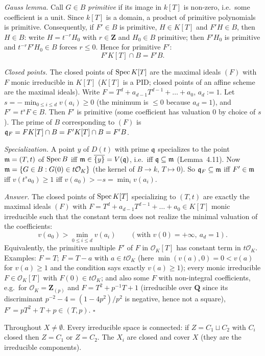 \documentclass[11pt]{article}
\begin{document}
\emph{Gauss lemma.} Call $G\in B$ \emph{primitive} if its image in $k[T]$ is non-zero, i.e.\ some coefficient is a unit. Since $k[T]$ is a domain, a product of primitive polynomials is primitive. Consequently, if $F'\in B$ is primitive, $H\in K[T]$ and $F'H\in B$, then $H\in B$: write $H=t^{-r}H_0$ with $r\in\mathbf Z$ and $H_0\in B$ primitive; then $F'H_0$ is primitive and $t^{-r}F'H_0\in B$ forces $r\le0$. Hence for primitive $F'$:
\[ F'K[T]\cap B=F'B. \]

\emph{Closed points.} The closed points of $\operatorname{Spec} K[T]$ are the maximal ideals $(F)$ with $F$ monic irreducible in $K[T]$ ($K[T]$ is a PID; closed points of an affine scheme are the maximal ideals). Write $F=T^d+a_{d-1}T^{d-1}+\dots+a_0$, $a_d:=1$. Let $s=-\min_{0\le i\le d}v(a_i)\ge0$ (the minimum is $\le0$ because $a_d=1$), and $F'=t^sF\in B$. Then $F'$ is primitive (some coefficient has valuation $0$ by choice of $s$). The prime of $B$ corresponding to $(F)$ is $\mathfrak q_F=FK[T]\cap B=F'K[T]\cap B=F'B$.

\emph{Specialization.} A point $y$ of $D(t)$ with prime $\mathfrak q$ specializes to the point $\mathfrak m=(T,t)$ of $\operatorname{Spec} B$ iff $\mathfrak m\in\overline{\{y\}}=V(\mathfrak q)$, i.e.\ iff $\mathfrak q\subseteq\mathfrak m$ (Lemma~4.11). Now $\mathfrak m=\{G\in B: G(0)\in t\mathcal O_K\}$ (the kernel of $B\to k$, $T\mapsto0$). So $\mathfrak q_F\subseteq\mathfrak m$ iff $F'\in\mathfrak m$ iff $v(t^sa_0)\ge1$ iff $v(a_0)>-s=\min_i v(a_i)$.

\emph{Answer.} The closed points of $\operatorname{Spec} K[T]$ specializing to $(T,t)$ are exactly the maximal ideals $(F)$ with $F=T^d+a_{d-1}T^{d-1}+\dots+a_0\in K[T]$ monic irreducible such that the constant term does not realize the minimal valuation of the coefficients:
\[ v(a_0)>\min_{0\le i\le d}v(a_i)\qquad(\text{with }v(0)=+\infty,\ a_d=1). \]
Equivalently, the primitive multiple $F'$ of $F$ in $\mathcal O_K[T]$ has constant term in $t\mathcal O_K$. Examples: $F=T$; $F=T-a$ with $a\in t\mathcal O_K$ (here $\min(v(a),0)=0<v(a)$ for $v(a)\ge1$ and the condition says exactly $v(a)\ge1$); every monic irreducible $F\in\mathcal O_K[T]$ with $F(0)\in t\mathcal O_K$; and also some $F$ with non-integral coefficients, e.g.\ for $\mathcal O_K=\mathbf Z_{(p)}$ and $F=T^2+p^{-1}T+1$ (irreducible over $\mathbf Q$ since its discriminant $p^{-2}-4=(1-4p^2)/p^2$ is negative, hence not a square), $F'=pT^2+T+p\in(T,p)$. \hfill$\square$

\pf
Throughout $X\ne\emptyset$. Every irreducible space is connected: if $Z=C_1\sqcup C_2$ with $C_i$ closed then $Z=C_1$ or $Z=C_2$. The $X_i$ are closed and cover $X$ (they are the irreducible components).
\end{document}
